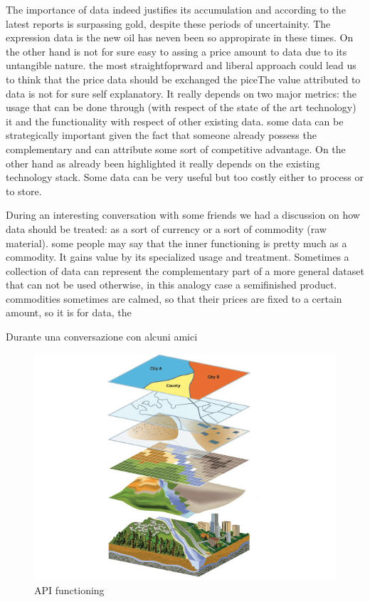 \documentclass[
  12pt,
  a4paper,
  oneside]{book}
\begin{document}
The importance of data indeed justifies its accumulation and according to the latest reports is surpassing gold, despite these periods of uncertainity. The expression data is the new oil has neven been so appropirate in these times.
On the other hand is not for sure easy to assing a price amount to data due to its untangible nature.
the most straightfoprward and liberal approach could lead us to think that the price data should be exchanged the piceThe value attributed to data is not for sure self explanatory. It really depends on two major metrics: the usage that can be done through (with respect of the state of the art technology) it and the functionality with respect of other existing data. some data can be strategically important given the fact that someone already possess the complementary and can attribute some sort of competitive advantage. On the other hand as already been highlighted it really depends on the existing technology stack. Some data can be very useful but too costly either to process or to store.

During an interesting conversation with some friends we had a discussion on how data should be treated: as a sort of currency or a sort of commodity (raw material).
some people may say that the inner functioning is pretty much as a commodity. It gains value by its specialized usage and treatment. Sometimes a collection of data can represent the complementary part of a more general dataset that can not be used otherwise, in this analogy case a semifinished product. commodities sometimes are calmed, so that their prices are fixed to a certain amount, so it is for data, the

Durante una conversazione con alcuni amici

\begin{figure}

{\centering \includegraphics[width=8.17in]{images/spatial} 

}

\caption{API functioning}\label{fig:casuale}
\end{figure}
\end{document}
